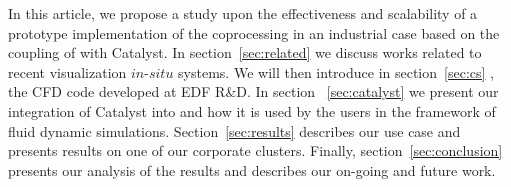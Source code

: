 In this article, we propose a study upon the effectiveness and scalability of a
prototype implementation of the coprocessing in an industrial case based on the
coupling of \CS with Catalyst. In section~\ref{sec:related} we
discuss works related to recent visualization $in$-$situ$ systems. We will then
introduce in section~\ref{sec:cs} \CS, the CFD code developed at EDF
R\&D. In section ~\ref{sec:catalyst} we present our integration of Catalyst into
\CS and how it is used by the users in the framework of fluid dynamic
simulations. Section~\ref{sec:results} describes our use case and presents
results on one of our corporate clusters. Finally, section~\ref{sec:conclusion} 
presents our analysis of the results and describes our on-going and future work.
